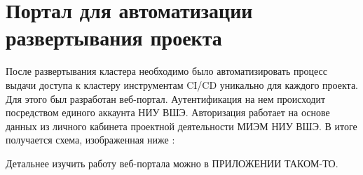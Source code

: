 \section{Портал для автоматизации развертывания проекта}
\label{sec:k8s-auth}

После развертывания кластера необходимо было автоматизировать процесс выдачи доступа к кластеру инструментам CI/CD уникально для каждого проекта. Для этого был разработан веб-портал. Аутентификация на нем происходит посредством единого аккаунта НИУ ВШЭ. Авторизация работает на основе данных из личного кабинета проектной деятельности МИЭМ НИУ ВШЭ. В итоге получается схема, изображенная ниже :

Детальнее изучить работу веб-портала можно в ПРИЛОЖЕНИИ ТАКОМ-ТО.
